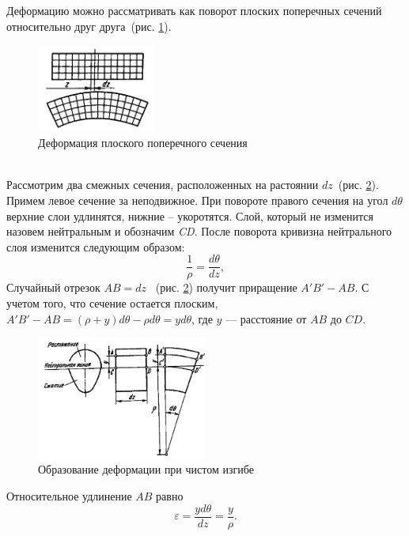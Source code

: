 \documentclass[12pt, a4paper]{article}
\begin{document}
\newpage Деформацию можно рассматривать как поворот плоских поперечных сечений относительно друг друга~(рис. \ref{pic3}).
\begin{figure}[!h]
	\centering
	\includegraphics[width=0.35\textwidth]{pic.3}%
	\caption{Деформация плоского поперечного сечения}
	\vspace*{-2mm}
	\label{pic3}
\end{figure}
\\ Рассмотрим два смежных сечения, расположенных на растоянии $dz$~(рис. \ref{pic4}). Примем левое сечение за неподвижное. При повороте правого сечения на угол $d\theta$ верхние слои удлинятся, нижние -- укоротятся. Слой, который не изменится назовем нейтральным и обозначим \emph{CD}. После поворота кривизна нейтрального слоя изменится следующим образом: 
\begin{equation}
	\label{1/qq}
	\frac {1}{\rho} = \frac {d\theta}{dz}, 
\end{equation}
Случайный отрезок $AB = dz$ ~(рис. \ref{pic4}) получит приращение $A'B' - AB$. С учетом того, что сечение остается плоским, $A'B' - AB = (\rho + y)d\theta - \rho d\theta = yd\theta$, где $y$ --- расстояние от $AB$ до $CD$. 
\begin{figure}[!h]
	\centering
	\includegraphics[width=0.5\textwidth]{pic.4}%
	\caption{Образование деформации при чистом изгибе}
	\vspace*{-2mm}
	\label{pic4}
\end{figure}

Относительное удлинение $AB$ равно 
\begin{equation}
	\label{eps}
	\varepsilon = \frac {y d\theta}{dz} = \frac{y}{\rho}.
\end{equation}
\end{document}
